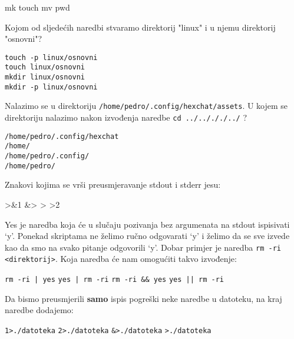 \documentclass[a4paper,11pt]{exam}
\newcommand{\shell}[1]{\texttt{#1}}
\begin{document}
\begin{questions}
	\begin{oneparchoices}
		\choice mk
		\choice touch
		\choice mv
		\choice pwd
	\end{oneparchoices}
	
	\question
	Kojom od sljedećih naredbi stvaramo direktorij "linux" i u njemu direktorij "osnovni"? 
	
	\begin{oneparchoices}
		\choice \shell{touch -p linux/osnovni} \\
		\choice \shell{touch linux/osnovni} \\
		\choice \shell{mkdir linux/osnovni} \\
		\choice \shell{mkdir -p linux/osnovni}
	\end{oneparchoices}
	
	\question
  Nalazimo se u direktoriju \shell{/home/pedro/.config/hexchat/assets}. U kojem se direktoriju nalazimo nakon izvođenja naredbe  \shell{cd ../../././../} ? 

	\begin{oneparchoices}
		\choice \shell{/home/pedro/.config/hexchat} \\
		\choice \shell{/home/} \\
		\choice \shell{/home/pedro/.config/} \\
		\choice \shell{/home/pedro/}
	\end{oneparchoices}
	
	\question
 Znakovi kojima se vrši preusmjeravanje stdout i stderr jesu: 
	\begin{oneparchoices}
		>\&1 
		\choice \&> 
		\choice >
		\choice >2
	\end{oneparchoices}
	
	\question
Yes je naredba koja će u slučaju pozivanja bez argumenata na stdout ispisivati ‘y’. Ponekad skriptama ne želimo ručno odgovarati ‘y’ i želimo da se sve izvede kao da smo na svako pitanje odgovorili ‘y’. Dobar primjer je naredba \shell{rm -ri <direktorij>}. Koja naredba će nam omogućiti takvo izvođenje:
	
	\begin{oneparchoices}
		\choice \shell{rm -ri | yes} 
		\choice \shell{yes | rm -ri} 
		\choice \shell{rm -ri \&\& yes} 
		\choice \shell{yes || rm -ri}
	\end{oneparchoices}
	
	\question
  Da bismo preusmjerili \textbf{samo} ispis pogreški neke naredbe u datoteku, na kraj naredbe dodajemo:

	\begin{oneparchoices}
	  \choice \shell{1>./datoteka} 
		\choice \shell{2>./datoteka} 
		\choice \shell{\&>./datoteka} 
		\choice \shell{>./datoteka}
	\end{oneparchoices}
	

\end{questions}
\end{document}
